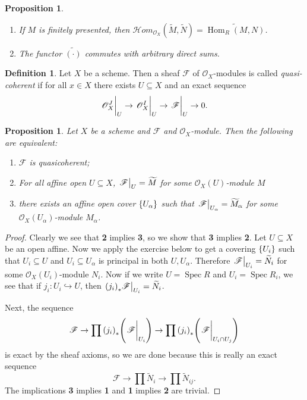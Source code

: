 \documentclass[leqno, openany]{memoir}
\newtheorem{prop}[thm]{Proposition}
\theoremstyle{definition}
\newtheorem{defn}[thm]{Definition}
\theoremstyle{remark}
\theoremstyle{plain}
\theoremstyle{definition}
\theoremstyle{remark}
\newcommand{\msc}[1]{\mathscr{#1}}
\newcommand{\wt}[1]{\widetilde{#1}}
\DeclareMathOperator{\Hom}{Hom}
\DeclareMathOperator{\Spec}{Spec}
\begin{document}
\begin{prop}\leavevmode
    \begin{enumerate}
        \item If $M$ is finitely presented, then $\msc{H}om_{\msc{O}_X}(\wt{M}, \wt{N}) = \wt{\Hom_R(M, N)}$.
        \item The functor $\wt{(\cdot )}$ commutes with arbitrary direct sums.
    \end{enumerate}
\end{prop}

\begin{defn}
    Let $X$ be a scheme. Then a sheaf $\msc{F}$ of $\msc{O}_X$-modules is called \textit{quasi-coherent} if for all $x \in X$ there exists $U \subseteq X$ and an exact sequence
    \[ \eval{\msc{O}_X^J}_U \to \eval{\msc{O}_X^I}_U \to \eval{\msc{F}}_U \to 0. \]
\end{defn}

\begin{prop}
    Let $X$ be a scheme and $\msc{F}$ and $\msc{O}_X$-module. Then the following are equivalent:
    \begin{enumerate}
        \item $\msc{F}$ is quasicoherent;
        \item For all affine open $U \subseteq X$, $\eval{\msc{F}}_U = \wt{M}$ for some $\msc{O}_X(U)$-module $M$
        \item there exists an affine open cover $\qty{U_{\alpha}}$ such that $\eval{\msc{F}}_{U_{\alpha}} = \wt{M}_{\alpha}$ for some $\msc{O}_X(U_{\alpha})$-module $M_{\alpha}$.
    \end{enumerate}
\end{prop}

\begin{proof}
    Clearly we see that \textbf{2} implies \textbf{3}, so we show that \textbf{3} implies \textbf{2}. Let $U \subseteq X$ be an open affine. Now we apply the exercise below to get a covering $\qty{U_i}$ such that $U_i \subseteq U$ and $U_i \subseteq U_{\alpha}$ is principal in both $U, U_{\alpha}$. Therefore $\eval{\msc{F}}_{U_i} = \wt{N}_i$ for some $\msc{O}_X(U_i)$-module $N_i$. Now if we write $U = \Spec R$ and $U_i = \Spec R_i$, we see that if $j_i \colon U_i \hookrightarrow U$, then $\eval{ {(j_i)}_* \msc{F} }_{U_i} = \wt{N}_i$.

    Next, the sequence
    \[ \msc{F} \to \prod {(j_i)}_* \qty(\eval{\msc{F}}_{U_i}) \to \prod {(j_i)}_* \qty(\eval{\msc{F}}_{U_i \cap U_j}) \]
    is exact by the sheaf axioms, so we are done because this is really an exact sequence
    \[ \msc{F} \to \prod \wt{N}_i \to \prod \wt{N}_{ij}. \]
    The implications \textbf{3} implies \textbf{1} and \textbf{1} implies \textbf{2} are trivial.
\end{proof}
\end{document}
